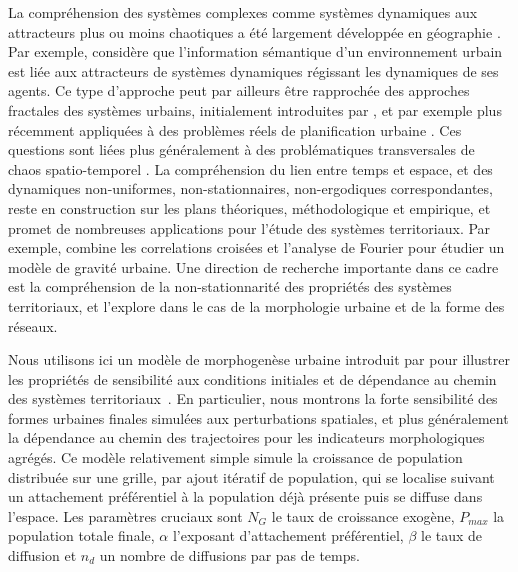 \documentclass[11pt]{article}
\begin{document}
La compréhension des systèmes complexes comme systèmes dynamiques aux attracteurs plus ou moins chaotiques a été largement développée en géographie \citep{dauphine1995chaos}. Par exemple, \cite{e18060197} considère que l'information sémantique d'un environnement urbain est liée aux attracteurs de systèmes dynamiques régissant les dynamiques de ses agents. Ce type d'approche peut par ailleurs être rapprochée des approches fractales des systèmes urbains, initialement introduites par \cite{batty1994fractal}, et par exemple plus récemment appliquées à des problèmes réels de planification urbaine \citep{yamu2015spatial}. Ces questions sont liées plus généralement à des problématiques transversales de chaos spatio-temporel \citep{crutchfield1987phenomenology}. La compréhension du lien entre temps et espace, et des dynamiques non-uniformes, non-stationnaires, non-ergodiques correspondantes, reste en construction sur les plans théoriques, méthodologique et empirique, et promet de nombreuses applications pour l'étude des systèmes territoriaux. Par exemple,  \cite{chen2009urban} combine les correlations croisées et l'analyse de Fourier pour étudier un modèle de gravité urbaine. Une direction de recherche importante dans ce cadre est la compréhension de la non-stationnarité des propriétés des systèmes territoriaux, et \cite{raimbault2018urban} l'explore dans le cas de la morphologie urbaine et de la forme des réseaux.





Nous utilisons ici un modèle de morphogenèse urbaine introduit par \cite{raimbault2018calibration} pour illustrer les propriétés de sensibilité aux conditions initiales et de dépendance au chemin des systèmes territoriaux~\citep{pumain2012urban}. En particulier, nous montrons la forte sensibilité des formes urbaines finales simulées aux perturbations spatiales, et plus généralement la dépendance au chemin des trajectoires pour les indicateurs morphologiques agrégés. Ce modèle relativement simple simule la croissance de population distribuée sur une grille, par ajout itératif de population, qui se localise suivant un attachement préférentiel à la population déjà présente puis se diffuse dans l'espace. Les paramètres cruciaux sont $N_G$ le taux de croissance exogène, $P_{max}$ la population totale finale, $\alpha$ l'exposant d'attachement préférentiel, $\beta$ le taux de diffusion et $n_d$ un nombre de diffusions par pas de temps.
\end{document}
